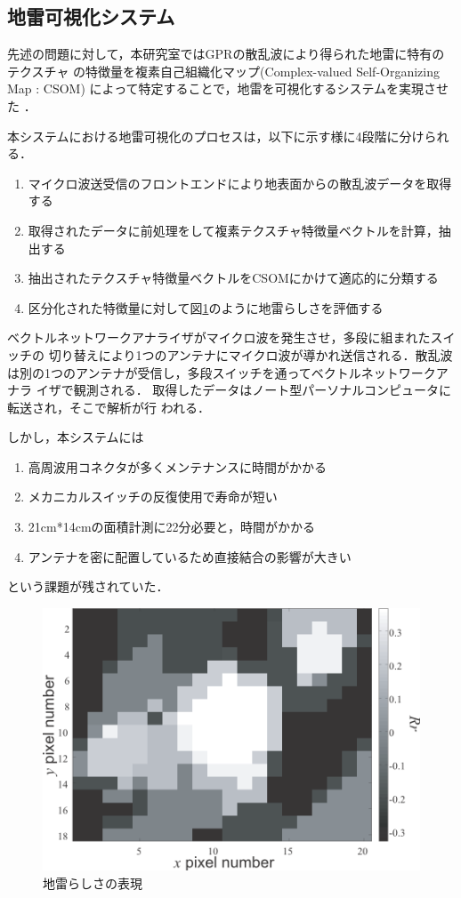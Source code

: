﻿\documentclass[12pt,oneside]{jsbook}
\begin{document}
\subsection{地雷可視化システム}
先述の問題に対して，本研究室ではGPRの散乱波により得られた地雷に特有のテクスチャ
の特徴量を複素自己組織化マップ(Complex-valued Self-Organizing Map : CSOM)
によって特定することで，地雷を可視化するシステムを実現させた
\cite{2007SMas}\cite{2008SMas}\cite{2009Nakano}\cite{2010Nakano}．

本システムにおける地雷可視化のプロセスは，以下に示す様に4段階に分けられる．
\begin{enumerate}
 \item マイクロ波送受信のフロントエンドにより地表面からの散乱波データを取得する
 \item 取得されたデータに前処理をして複素テクスチャ特徴量ベクトルを計算，抽出する
 \item 抽出されたテクスチャ特徴量ベクトルをCSOMにかけて適応的に分類する
 \item 区分化された特徴量に対して図\ref{so1mine}のように地雷らしさを評価する
\end{enumerate}
ベクトルネットワークアナライザがマイクロ波を発生させ，多段に組まれたスイッチの
切り替えにより1つのアンテナにマイクロ波が導かれ送信される．散乱波
は別の1つのアンテナが受信し，多段スイッチを通ってベクトルネットワークアナラ
イザで観測される．
取得したデータはノート型パーソナルコンピュータに転送され，そこで解析が行
われる．

しかし，本システムには
\begin{enumerate}
 \item 高周波用コネクタが多くメンテナンスに時間がかかる
 \item メカニカルスイッチの反復使用で寿命が短い
 \item 21cm*14cmの面積計測に22分必要と，時間がかかる
 \item アンテナを密に配置しているため直接結合の影響が大きい
\end{enumerate}
という課題が残されていた．
\begin{figure}[t]
\includegraphics[width = \hsize]{so1mine.png}
\caption{地雷らしさの表現}
\label{so1mine}
\end{figure}
\end{document}
